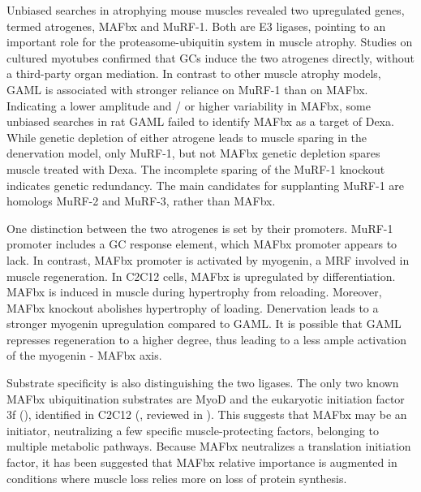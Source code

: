 \documentclass[12pt,english]{report}\usepackage[]{graphicx}\usepackage[]{color}
\begin{document}
Unbiased searches in atrophying mouse muscles revealed two upregulated
genes, termed atrogenes, MAFbx and MuRF-1\citep{bodine2001identification}.
Both are E3 ligases, pointing to an important role for the proteasome-ubiquitin
system in muscle atrophy. Studies on cultured myotubes confirmed that
GCs induce the two atrogenes directly, without a third-party organ
mediation\citep{stitt2004igf-1/pi3k/akt}. In contrast to other muscle
atrophy models, GAML is associated with stronger reliance on MuRF-1
than on MAFbx. Indicating a lower amplitude and / or higher variability
in MAFbx, some unbiased searches in rat GAML failed to identify MAFbx
as a target of Dexa\citep{wu2010redd1}. While genetic depletion of
either atrogene leads to muscle sparing in the denervation model\citep{bodine2001identification},
only MuRF-1, but not MAFbx genetic depletion spares muscle treated
with Dexa\citep{baehr2011muscle}. The incomplete sparing of the MuRF-1
knockout indicates genetic redundancy. The main candidates for supplanting
MuRF-1 are homologs MuRF-2 and MuRF-3, rather than MAFbx.

One distinction between the two atrogenes is set by their promoters.
MuRF-1 promoter includes a GC response element, which MAFbx promoter
appears to lack\citep{waddell2008glucocorticoid,braun2015regulation}.
In contrast, MAFbx promoter is activated by myogenin\citep{moresi2010myogenin},
a MRF involved in muscle regeneration. In C2C12 cells, MAFbx is upregulated
by differentiation\citep{nishimura2008effects}. MAFbx is induced
in muscle during hypertrophy from reloading\citep{slimani2012worsening}.
Moreover, MAFbx knockout abolishes hypertrophy of loading\citep{baehr2014muscle}.
Denervation leads to a stronger myogenin upregulation compared to
GAML\citep{mozaffar2007molecular}. It is possible that GAML represses
regeneration to a higher degree, thus leading to a less ample activation
of the myogenin - MAFbx axis.

Substrate specificity is also distinguishing the two ligases. The
only two known MAFbx ubiquitination substrates are MyoD and the eukaryotic
initiation factor 3f (),
identified in C2C12 (\citep{tintignac2005degradation,lagirand-cantaloube2008initiation},
reviewed in \citep{bodine2014skeletal}). This suggests that MAFbx
may be an initiator, neutralizing a few specific muscle-protecting
factors, belonging to multiple metabolic pathways. Because MAFbx neutralizes
a translation initiation factor, it has been suggested that MAFbx
relative importance is augmented in conditions where muscle loss relies
more on loss of protein synthesis. 
\end{document}
